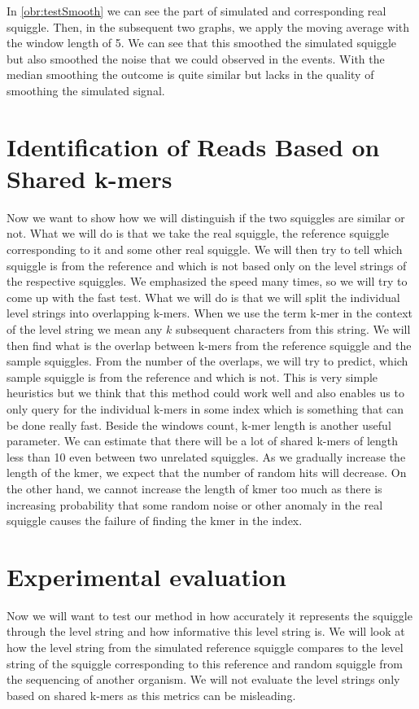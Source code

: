 In \ref{obr:testSmooth} we can see the part of simulated and corresponding real squiggle.
Then, in the subsequent two graphs, we apply the moving average with the window length
of 5. We can see that this smoothed the simulated squiggle but also smoothed the noise
that we could observed in the events. With the median smoothing the outcome is quite
similar but lacks in the quality of smoothing the simulated signal.

\section{Identification of Reads Based on Shared k-mers}

Now we want to show how we will distinguish if the two squiggles are similar or not.
What we will do is that we take the real squiggle, the reference squiggle corresponding to it and
some other real squiggle. We will then try to tell which squiggle is from the reference
and which is not based only on the level strings of the respective squiggles. We
emphasized the speed many times, so we will try to come up with the fast test.
What we will do is that we will split the individual level strings into overlapping k-mers.
When we use the term k-mer in the context of the level string we mean any $k$ subsequent
characters from this string. We will then find what is the overlap
between k-mers from the reference squiggle and the sample squiggles. From the number of the overlaps, we will try
to predict, which sample squiggle is from the reference and which is not. This is very
simple heuristics but we think that this method could work well and also enables us
to only query for the individual k-mers in some index which is something that can be done really fast.
Beside the windows count, k-mer length is another useful parameter. We can estimate
that there will be a lot of shared k-mers of length less than 10 even between two unrelated
squiggles. As we gradually increase the length of the kmer, we expect that the number
of random hits will decrease. On the other hand, we cannot increase the length of kmer
too much as there is increasing probability that some random noise or other anomaly
in the real squiggle causes the failure of finding the kmer in the index.

\section{Experimental evaluation}

Now we will want to test our method in how accurately it represents the squiggle
through the level string and how informative this level string is. We will
look at how the level string from the simulated reference squiggle compares to the
level string of the squiggle corresponding to this reference and random squiggle
from the sequencing of another organism. We will not evaluate the level strings
only based on shared k-mers as this metrics can be misleading.


